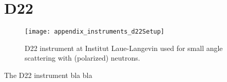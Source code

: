 \documentclass[\main/dresen_thesis.tex]{subfiles}
\begin{document}
  \section{D22}\label{ch:lss:d22}
    \begin{figure}[ht]
      \centering
      \texttt{[image: appendix\_instruments\_d22Setup]}
      \caption{\label{fig:lss:d22}D22 instrument at Institut Laue-Langevin used for small angle scattering with (polarized) neutrons.}
    \end{figure}
    The D22 instrument bla bla
\end{document}
